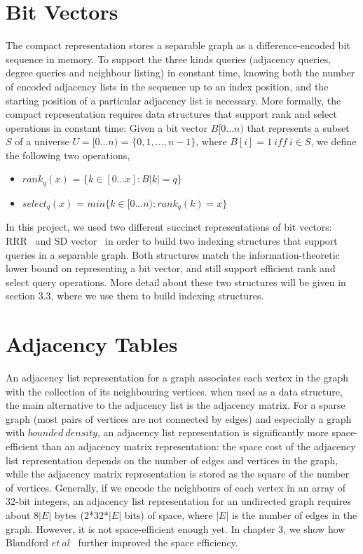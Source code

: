 \documentclass[12pt,glossary]{dalthesis}
\begin{document}
\bigskip
\bigskip

\section{Bit Vectors}
The compact representation stores a separable graph as a difference-encoded bit sequence in memory. To support the three kinds queries (adjacency queries, degree queries and neighbour listing) in constant time, knowing both the number of encoded adjacency lists in the sequence up to an index position, and the starting position of a particular adjacency list is necessary. More formally, the compact representation requires data structures that support rank and select operations in constant time: Given a bit vector $B[0...n)$ that represents a subset $S$ of a universe $U = [0...n)$ = $\{0,1,...,n-1 \}$, where $B[i] = 1 \ iff \ i \in S$, we define the following two operations, 

\begin{itemize}[noitemsep]
\item $rank_{q}(x)$ = $\{k \in [0...x] : B|k| = q \}$
\item $select_{q}(x)$ = $ min \{ k \in [0...n) : rank_{q}(k) = x \} $ 
\end{itemize}


In this project, we used two different succinct representations of bit vectors: RRR~\cite{RRR} and SD vector~\cite{SD-vector} in order to build two indexing structures that support queries in a separable graph. Both structures match the information-theoretic lower bound on representing a bit vector, and still support efficient rank and select query operations. More detail about these two structures will be given in section 3.3, where we use them to build indexing structures.

\bigskip
\bigskip
\section{Adjacency Tables}
An adjacency list representation for a graph associates each vertex in the graph with the collection of its neighbouring vertices. when used as a data structure, the main alternative to the adjacency list is the adjacency matrix. For a sparse graph (most pairs of vertices are not connected by edges) and especially a graph with $bounded \ density$, an adjacency list representation is significantly more space-efficient than an adjacency matrix representation: the space cost of the adjacency list representation depends on the number of edges and vertices in the graph, while the adjacency matrix representation is stored as the square of the number of vertices. Generally, if we encode the neighbours of each vertex in an array of 32-bit integers, an adjacency list representation for an undirected graph requires about 8$|E|$ bytes (2*32*$|E|$ bits) of space, where $|E|$ is the number of edges in the graph. However, it is not space-efficient enough yet. In chapter 3, we show how Blandford $et \ al$~\cite{compact-representation} further improved the space efficiency.
\end{document}
